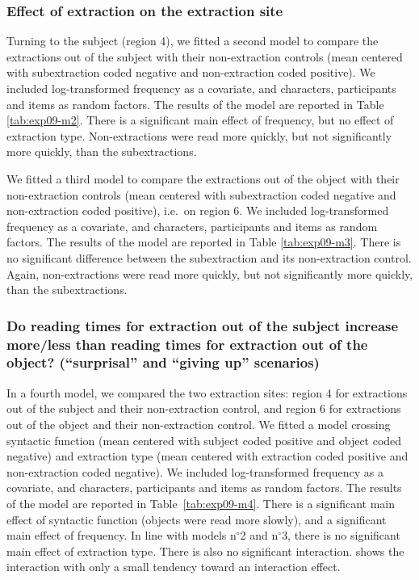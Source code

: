 

\subsubsection{Effect of extraction on the extraction site}

Turning to the subject (region 4), we fitted a second model to compare the extractions out of the subject with their non-extraction controls (mean centered with subextraction coded negative and non-extraction coded positive). We included log-transformed frequency as a covariate, and characters, participants and items as random factors. The results of the model are reported in Table \ref{tab:exp09-m2}. 
There is a significant main effect of frequency, but no effect of extraction type. Non-extractions were read more quickly, but not significantly more quickly, than the subextractions.



We fitted a third model to compare the extractions out of the object with their non-extraction controls (mean centered with subextraction coded negative and non-extraction coded positive), i.e.\ on region 6. We included log-transformed frequency as a covariate, and characters, participants and items as random factors. The results of the model are reported in Table \ref{tab:exp09-m3}. 
There is no significant difference between the subextraction and its non-extraction control. Again, non-extractions were read more quickly, but not significantly more quickly, than the subextractions.



\subsubsection{Do reading times for extraction out of the subject increase more/less than reading times for extraction out of the object? (``surprisal'' and ``giving up'' scenarios)}

In a fourth model, we compared the two extraction sites: region 4 for extractions out of the subject and their non-extraction control, and region 6 for extractions out of the object and their non-extraction control. We fitted a model crossing syntactic function (mean centered with subject coded positive and object coded negative) and extraction type (mean centered with extraction coded positive and non-extraction coded negative). We included log-transformed frequency as a covariate, and characters, participants and items as random factors. The results of the model are reported in Table~\ref{tab:exp09-m4}. 
There is a significant main effect of syntactic function (objects were read more slowly), and a significant main effect of frequency. In line with models n$^{\circ}$2 and n$^{\circ}$3, there is no significant main effect of extraction type. There is also no significant interaction. 
 shows the interaction with only a small tendency toward an interaction effect.

